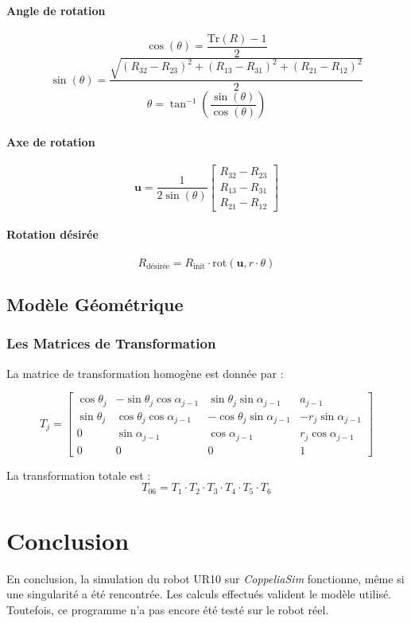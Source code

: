 \documentclass[a4paper,12pt]{article}
\begin{document}
\paragraph{Angle de rotation}
\[
\cos(\theta) = \frac{\text{Tr}(R) - 1}{2}
\]
\[
\sin(\theta) = \frac{\sqrt{(R_{32} - R_{23})^2 + (R_{13} - R_{31})^2 + (R_{21} - R_{12})^2}}{2}
\]
\[
\theta = \tan^{-1}\left(\frac{\sin(\theta)}{\cos(\theta)}\right)
\]

\paragraph{Axe de rotation}
\[
\mathbf{u} = \frac{1}{2\sin(\theta)} 
\begin{bmatrix}
R_{32} - R_{23} \\ R_{13} - R_{31} \\ R_{21} - R_{12}
\end{bmatrix}
\]

\paragraph{Rotation désirée}
\[
R_{\text{désirée}} = R_{\text{init}} \cdot \text{rot}(\mathbf{u}, r \cdot \theta)
\]

\subsection{Modèle Géométrique}
\subsubsection{Les Matrices de Transformation}
La matrice de transformation homogène est donnée par :

\[
T_j = \begin{bmatrix}
\cos\theta_j & -\sin\theta_j \cos\alpha_{j-1} & \sin\theta_j \sin\alpha_{j-1} & a_{j-1} \\
\sin\theta_j & \cos\theta_j \cos\alpha_{j-1} & -\cos\theta_j \sin\alpha_{j-1} & -r_j \sin\alpha_{j-1} \\
0 & \sin\alpha_{j-1} & \cos\alpha_{j-1} & r_j \cos\alpha_{j-1} \\
0 & 0 & 0 & 1
\end{bmatrix}
\]

La transformation totale est :
\[
T_{06} = T_1 \cdot T_2 \cdot T_3 \cdot T_4 \cdot T_5 \cdot T_6
\]

\section{Conclusion}
En conclusion, la simulation du robot UR10 sur \textit{CoppeliaSim} fonctionne, même si une singularité a été rencontrée. Les calculs effectués valident le modèle utilisé. Toutefois, ce programme n'a pas encore été testé sur le robot réel.  
\end{document}

